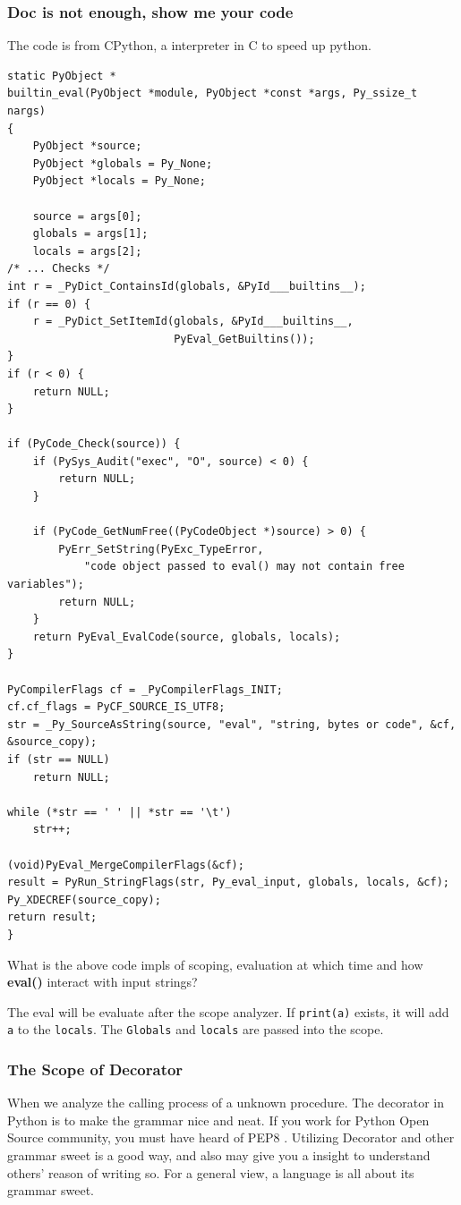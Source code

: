 \documentclass[a4paper]{exam}
\begin{document}
\subsubsection{Doc is not enough, show me your code}

The code is from CPython\cite{CPython}, a interpreter in C to speed up python.
\begin{verbatim}
static PyObject *
builtin_eval(PyObject *module, PyObject *const *args, Py_ssize_t nargs)
{
    PyObject *source;
    PyObject *globals = Py_None;
    PyObject *locals = Py_None;

    source = args[0];
    globals = args[1];
    locals = args[2];
/* ... Checks */
int r = _PyDict_ContainsId(globals, &PyId___builtins__);
if (r == 0) {
    r = _PyDict_SetItemId(globals, &PyId___builtins__,
                          PyEval_GetBuiltins());
}
if (r < 0) {
    return NULL;
}

if (PyCode_Check(source)) {
    if (PySys_Audit("exec", "O", source) < 0) {
        return NULL;
    }

    if (PyCode_GetNumFree((PyCodeObject *)source) > 0) {
        PyErr_SetString(PyExc_TypeError,
            "code object passed to eval() may not contain free variables");
        return NULL;
    }
    return PyEval_EvalCode(source, globals, locals);
}

PyCompilerFlags cf = _PyCompilerFlags_INIT;
cf.cf_flags = PyCF_SOURCE_IS_UTF8;
str = _Py_SourceAsString(source, "eval", "string, bytes or code", &cf, &source_copy);
if (str == NULL)
    return NULL;

while (*str == ' ' || *str == '\t')
    str++;

(void)PyEval_MergeCompilerFlags(&cf);
result = PyRun_StringFlags(str, Py_eval_input, globals, locals, &cf);
Py_XDECREF(source_copy);
return result;
}
\end{verbatim}

What is the above code impls of scoping, evaluation at which time and how \textbf{eval()} interact with input strings?

\begin{solution}
The eval will be evaluate after the scope analyzer. If \texttt{print(a)} exists, it will add \texttt{a} to the \texttt{locals}. The \texttt{Globals} and \texttt{locals} are passed into the scope.
\end{solution}
\subsubsection{The Scope of Decorator}
When we analyze the calling process of a unknown procedure. The decorator in Python is to make the grammar nice and neat. If you work for Python Open Source community, you must have heard of PEP8 \cite{pep8}. Utilizing Decorator and other grammar sweet is a good way, and also may give you a insight to understand others' reason of writing so. For a general view, a language is all about its grammar sweet.
\end{document}
